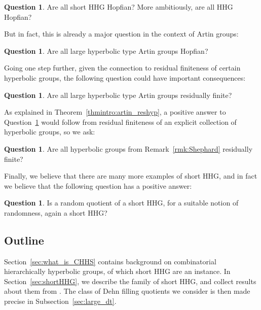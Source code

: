 \documentclass[svgnames]{amsart}
\theoremstyle{plain}
\theoremstyle{definition}
\newtheorem{questintro}[thmintro]{Question}
\begin{document}
\begin{questintro}
    Are all short HHG Hopfian? More ambitiously, are all HHG Hopfian?
\end{questintro}

But in fact, this is already a major question in the context of Artin groups:

\begin{questintro}
    Are all large hyperbolic type Artin groups Hopfian?
\end{questintro}

Going one step further, given the connection to residual finiteness of certain hyperbolic groups, the following question could have important consequences:

\begin{questintro}\label{quest:artin_rf}
    Are all large hyperbolic type Artin groups residually finite?
\end{questintro}

As explained in Theorem~\ref{thmintro:artin_reshyp}, a positive answer to Question~\ref{quest:artin_rf} would follow from residual finiteness of an explicit collection of hyperbolic groups, so we ask:

\begin{questintro}
    Are all hyperbolic groups from Remark~\ref{rmk:Shephard} residually finite?
\end{questintro}

Finally, we believe that there are many more examples of short HHG, and in fact we believe that the following question has a positive answer:


\begin{questintro}
    Is a random quotient of a short HHG, for a suitable notion of randomness, again a short HHG?
\end{questintro}



\subsection*{Outline}
Section~\ref{sec:what_is_CHHS} contains background on combinatorial hierarchically hyperbolic groups, of which short HHG are an instance. In Section~\ref{sec:shortHHG}, we describe the family of short HHG, and collect results about them from \cite{Short_HHG:I}. The class of Dehn filling quotients we consider is then made precise in Subsection~\ref{sec:large_dt}. 
\par\medskip
\end{document}
